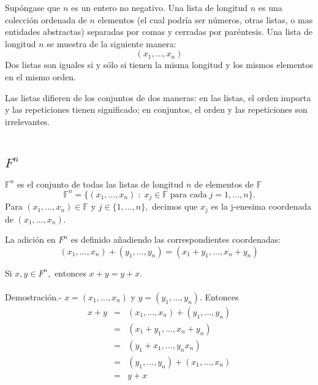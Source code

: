 \begin{tcolorbox}[colback=white]
    \begin{def.} 
	Supóngase que $n$ es un entero no negativo. Una lista de longitud $n$ es una colección ordenada de $n$ elementos (el cual podría ser números, otras listas, o mas entidades abstractas) separadas por comas y cerradas por paréntesis. Una lista de longitud $n$ se muestra de la siguiente manera:
	$$(x_1,\ldots,x_n)$$
	Dos listas son iguales si y sólo si tienen la misma longitud y los mismos elementos en el mismo orden.
    \end{def.}
\end{tcolorbox}
Las listas difieren de los conjuntos de dos maneras: en las listas, el orden importa y las repeticiones tienen significado; en conjuntos, el orden y las repeticiones son irrelevantes.\\\\

\subsection{\boldmath $F^n$}

\begin{tcolorbox}[colback=white]
    \begin{def.} 
	$\mathbb{F}^n$ es el conjunto de todas las listas de longitud $n$ de elementos de $\mathbb{F}$
	$$\mathbb{F}^n = \lbrace (x_1,\ldots, x_n)\; : \; x_j \in \mathbb{F} \; \mbox{para cada}\; j = 1,\ldots, n\rbrace.$$
	Para $(x_1,\ldots, x_n)\in \mathbb{F}$ y $j\in \lbrace 1, \ldots, n\rbrace,$ decimos que $x_j$ es la j-enesima coordenada de $(x_1,\ldots, x_n)$.
    \end{def.}
\end{tcolorbox}

\begin{tcolorbox}[colback=white]
    \begin{def.}
	La adición en $F^n$ es definido añadiendo las correspondientes coordenadas: 
	$$(x_1,\ldots,x_n)+(y_1,\ldots, y_n)=(x_1+y_1,\ldots, x_n + y_n)$$
    \end{def.}
\end{tcolorbox}

\begin{teo}
    Si $x,y \in F^n,$ entonces $x+y=y+x$.\\\\
    Demostración.-\; $x=(x_1,\ldots, x_n)$ y $y=(y_1,\ldots, y_n)$. Entonces
    $$\begin{array}{rcl}
	x+y&=&(x_1,\ldots,x_n)+(y_1,\ldots,y_n)\\
	   &=&(x_1+y_1,\ldots, x_n + y_n)\\
	   &=&(y_1+x_1,\ldots, y_n x_n)\\
	   &=&(y_1,\ldots,y_n)+(x_1,\ldots,x_n)\\
	   &=&y+x\\
    \end{array}$$
\end{teo}

